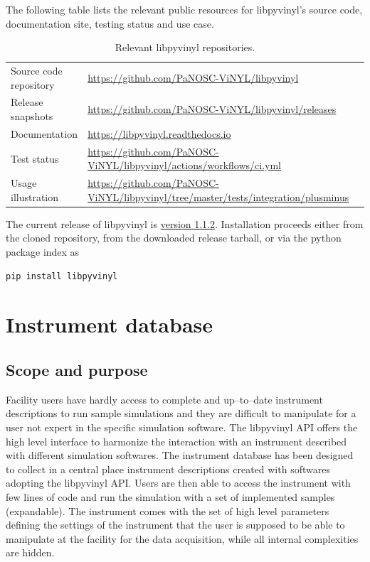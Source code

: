 \documentclass[11pt, a4paper]{article}
\begin{document}
The following table lists the relevant public resources for
libpyvinyl's source code, documentation site, testing status and use case.
\begin{table}[ht]
  \label{tab:lpv_repos}
  \centering
  \begin{center}
    \caption{Relevant libpyvinyl repositories.}
    \begin{tabular}{l p{10cm}l}
      \hline
      Source code repository & \url{https://github.com/PaNOSC-ViNYL/libpyvinyl} \\
      Release snapshots & \url{https://github.com/PaNOSC-ViNYL/libpyvinyl/releases}\\
      Documentation & \url{https://libpyvinyl.readthedocs.io}\\
      Test status  & \url{https://github.com/PaNOSC-ViNYL/libpyvinyl/actions/workflows/ci.yml}\\
      Usage illustration & \url{https://github.com/PaNOSC-ViNYL/libpyvinyl/tree/master/tests/integration/plusminus}\\
      \hline
    \end{tabular}
  \end{center}
\end{table}

The current release of libpyvinyl is
\href{HTTPS://GITHUB.COM/pAnosc-vInyl/LIBPYVINYL/RELEASES/TAG/V1.1.2}{version 1.1.2}. Installation proceeds either from the cloned repository, from the
downloaded release tarball, or via the python package index as
\begin{lstlisting}[language=Python]
pip install libpyvinyl
\end{lstlisting}

\section{Instrument database}
\subsection{Scope and purpose}
Facility users have hardly access to complete and up--to--date instrument descriptions to run sample simulations and they are difficult to manipulate for a user not expert in the specific simulation software. 
The libpyvinyl API offers the high level interface to harmonize the interaction with an instrument described with different simulation softwares.
The instrument database has been designed to collect in a central place instrument descriptions created with softwares adopting the libpyvinyl API. Users are then able to access the instrument with few lines of code and run the simulation with a set of implemented samples (expandable). The instrument comes with the set of high level parameters defining the settings of the instrument that the user is supposed to be able to manipulate at the facility for the data acquisition, while all internal complexities are hidden.
\end{document}
